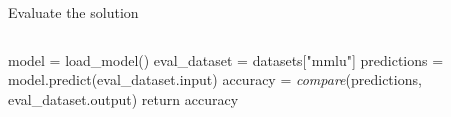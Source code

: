 \begin{frame}[allowframebreaks]{Evaluate the solution}
\begin{columns}
        \begin{column}{0.65\textwidth}
            \begin{algorithm}[H]
            \begin{algorithmic}[1]
                \STATE model = load\_model()
                \STATE eval\_dataset = datasets["mmlu"]
                \STATE predictions = model.predict(eval\_dataset.input)
                \STATE accuracy = \textit{compare}(predictions, eval\_dataset.output)
                \STATE return accuracy
            \end{algorithmic}
            \caption{Evaluate pseudocode}
            \label{alg:evaluate}
            \end{algorithm}
        \end{column}
    \end{columns}

    
\end{frame}